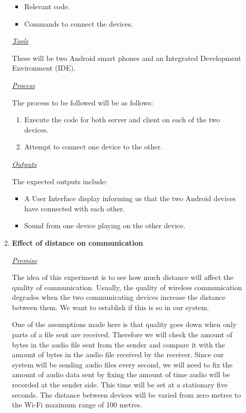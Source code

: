 \documentclass[12pt,svgnames,smaller]{article} %
\begin{document}
\begin{enumerate}
\begin{enumerate}
			\begin{itemize}
				\item Relevant code.
				\item Commands to connect the devices.
			\end{itemize}
			
			\emph{\underline{\textsf{Tools}}}
			
			These will be two Android smart phones and an Integrated Development Environment (IDE).
			
			\emph{\underline{\textsf{Process}}}
			
			The process to be followed will be as follows:
			
			\begin{enumerate}
				\item Execute the code for both server and client on each of the two devices.
				\item Attempt to connect one device to the other.
			\end{enumerate}
			
			\emph{\underline{\textsf{Outputs}}}
			
			The expected outputs include:
			
			\begin{itemize}
				\item A User Interface display informing us that the two Android devices have connected with each other.
				\item Sound from one device playing on the other device.
			\end{itemize}
			
			
			\item \textbf{Effect of distance on communication}
			
			\emph{\underline{\textsf{Premise}}}
			
			The idea of this experiment is to see how much distance will affect the quality of communication. Usually, the quality of wireless communication degrades when the two communicating devices increase the distance between them. We want to establish if this is so in our system. 
			
			One of the assumptions made here is that quality goes down when only parts of a file sent are received. Therefore we will check the amount of bytes in the audio file sent from the sender and compare it with the amount of bytes in the audio file received by the receiver. Since our system will be sending audio files every second, we will need to fix the amount of audio data sent by fixing the amount of time audio will be recorded at the sender side. This time will be set at a stationary five seconds. The distance between devices will be varied from zero metres to the Wi-Fi maximum range of 100 metres.
			

\end{enumerate}
\end{enumerate}
\end{document}
